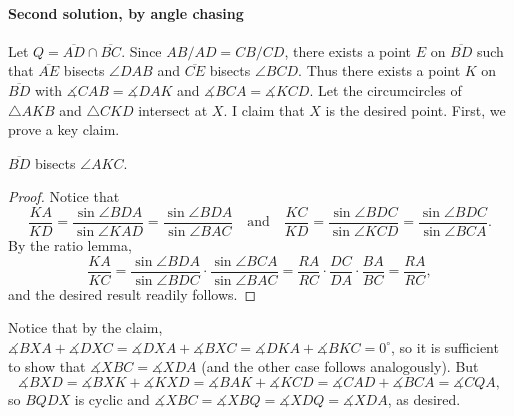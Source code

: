 \paragraph{Second solution, by angle chasing}     Let $Q=\overline{AD}\cap\overline{BC}$. Since $AB/AD=CB/CD$, there exists a point $E$ on $\overline{BD}$ such that $\overline{AE}$ bisects $\angle DAB$ and $\overline{CE}$ bisects $\angle BCD$. Thus there exists a point $K$ on $\overline{BD}$ with $\measuredangle CAB=\measuredangle DAK$ and $\measuredangle BCA=\measuredangle KCD$. Let the circumcircles of $\triangle AKB$ and $\triangle CKD$ intersect at $X$. I claim that $X$ is the desired point. First, we prove a key claim.
\begin{claim*}
    $\overline{BD}$ bisects $\angle AKC$.
\end{claim*}
\begin{proof}
    Notice that \[\frac{KA}{KD}=\frac{\sin\angle BDA}{\sin\angle KAD}=\frac{\sin\angle BDA}{\sin\angle BAC}\quad\text{and}\quad\frac{KC}{KD}=\frac{\sin\angle BDC}{\sin\angle KCD}=\frac{\sin \angle BDC}{\sin\angle BCA}.\]
    By the ratio lemma, \[\frac{KA}{KC}=\frac{\sin\angle BDA}{\sin\angle BDC}\cdot\frac{\sin\angle BCA}{\sin\angle BAC}=\frac{RA}{RC}\cdot\frac{DC}{DA}\cdot\frac{BA}{BC}=\frac{RA}{RC},\]
    and the desired result readily follows.
\end{proof}

Notice that by the claim, $\measuredangle BXA+\measuredangle DXC=\measuredangle DXA+\measuredangle BXC=\measuredangle DKA+\measuredangle BKC=0^\circ$, so it is sufficient to show that $\measuredangle XBC=\measuredangle XDA$ (and the other case follows analogously). But \[\measuredangle BXD=\measuredangle BXK+\measuredangle KXD=\measuredangle BAK+\measuredangle KCD=\measuredangle CAD+\measuredangle BCA=\measuredangle CQA,\]
so $BQDX$ is cyclic and $\measuredangle XBC=\measuredangle XBQ=\measuredangle XDQ=\measuredangle XDA$, as desired.

